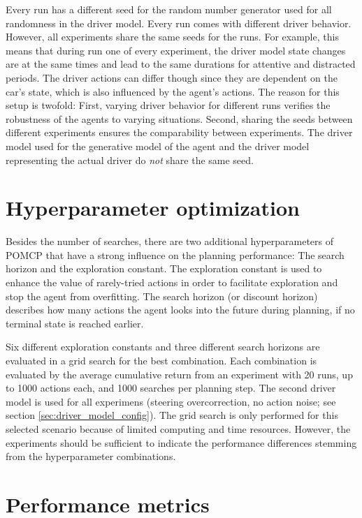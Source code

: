 Every run has a different seed for the random number generator used for all randomness in the driver model. Every run comes with different driver behavior. However, all experiments share the same seeds for the runs. For example, this means that during run one of every experiment, the driver model state changes are at the same times and lead to the same durations for attentive and distracted periods. The driver actions can differ though since they are dependent on the car's state, which is also influenced by the agent's actions. The reason for this setup is twofold: First, varying driver behavior for different runs verifies the robustness of the agents to varying situations. Second, sharing the seeds between different experiments ensures the comparability between experiments. The driver model used for the generative model of the agent and the driver model representing the actual driver do \emph{not} share the same seed.

\section{Hyperparameter optimization}
\label{sec:exp_hyperparams}

Besides the number of searches, there are two additional hyperparameters of POMCP that have a strong influence on the planning performance: The search horizon and the exploration constant. The exploration constant is used to enhance the value of rarely-tried actions in order to facilitate exploration and stop the agent from overfitting. The search horizon (or discount horizon) describes how many actions the agent looks into the future during planning, if no terminal state is reached earlier.

Six different exploration constants and three different search horizons are evaluated in a grid search for the best combination. Each combination is evaluated by the average cumulative return from an experiment with 20 runs, up to 1000 actions each, and 1000 searches per planning step. The second driver model is used for all experimens (steering overcorrection, no action noise; see section \ref{sec:driver_model_config}). The grid search is only performed for this selected scenario because of limited computing and time resources. However, the experiments should be sufficient to indicate the performance differences stemming from the hyperparameter combinations.

\section{Performance metrics}
\label{sec:perf_metrics}

